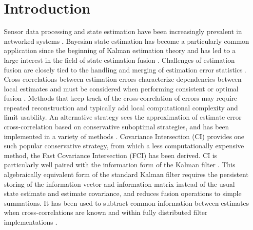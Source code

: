 \documentclass[letterpaper, 10 pt, conference]{ieeeconf}  %
\begin{document}
\section{Introduction}
Sensor data processing and state estimation have been increasingly prevalent in networked systems \cite{ligginsDistributedDataFusion2012,chongFortyYearsDistributed2017}. Bayesian state estimation has become a particularly common application since the beginning of Kalman estimation theory \cite{kalmanNewApproachLinear1960} and has led to a large interest in the field of state estimation fusion \cite{willnerKalmanFilterAlgorithms1976,chongHierarchicalEstimation1979,chongDistributedTrackingDistributed1986,hashemipourDecentralizedStructuresParallel1988,grimeDataFusionDecentralized1994}. Challenges of estimation fusion are closely tied to the handling and merging of estimation error statistics \cite{fouratiMultisensorDataFusion2017}. Cross-correlations between estimation errors characterize dependencies between local estimates and must be considered when performing consistent or optimal fusion \cite{bar-shalomTracktotrackCorrelationProblem1981,sunMultisensorOptimalInformation2004}. Methods that keep track of the cross-correlation of errors may require repeated reconstruction \cite{steinbringOptimalSamplebasedFusion2016} and typically add local computational complexity and limit usability. An alternative strategy sees the approximation of estimate error cross-correlation based on conservative suboptimal strategies, and has been implemented in a variety of methods \cite{carlsonFederatedFilterFaulttolerant1988,julierNondivergentEstimationAlgorithm1997,sijsStateFusionUnknown2012,noackDecentralizedDataFusion2017,niehsenInformationFusionBased2002,frankenImprovedFastCovariance2005}. Covariance Intersection (CI) \cite{julierNondivergentEstimationAlgorithm1997} provides one such popular conservative strategy, from which a less computationally expensive method, the Fast Covariance Intersection (FCI) \cite{niehsenInformationFusionBased2002} has been derived. CI is particularly well paired with the information form of the Kalman filter \cite{mutambaraDecentralizedEstimationControl1998}. This algebraically equivalent form of the standard Kalman filter requires the persistent storing of the information vector and information matrix instead of the usual state estimate and estimate covariance, and reduces fusion operations to simple summations. It has been used to subtract common information between estimates when cross-correlations are known \cite{grimeDataFusionDecentralized1994} and within fully distributed filter implementations \cite{pfaffInformationFormDistributed2017}.
\end{document}
